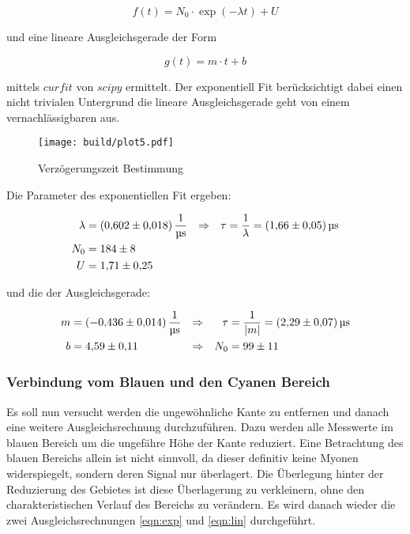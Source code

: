 \begin{equation}
	f(t)=N_0 \cdot \exp(-\lambda t) + U
	\label{eqn:exp}
\end{equation}

und eine lineare Ausgleichsgerade der Form

\begin{equation}
	g(t)=m \cdot t +b
	\label{eqn:lin}
\end{equation}

mittels $curfit$ von $scipy$ ermittelt. 
Der exponentiell Fit berücksichtigt dabei einen nicht trivialen Untergrund die lineare Ausgleichsgerade geht von einem vernachlässigbaren aus. 

\begin{figure}[H]
	\centering
	\texttt{[image: build/plot5.pdf]}
	\caption{Verzögerungszeit Bestimmung}\label{fig:plt5}
\end{figure}

Die Parameter des exponentiellen Fit ergeben:

\begin{align}
	\lambda&=\qty{0.602(0.018)}{\per\us} &\Rightarrow & & \tau&=\frac{1}{\lambda }=\qty{1.66(0.05)}{\us} \\
	N_0&=\num{184(8)} \notag \\
	U&=\num{1.71(0.25)} \notag
\end{align}

und die der Ausgleichsgerade: 

\begin{align}
	m&=\qty{-0.436(0.014)}{\per\us} &\Rightarrow & & \tau&=\frac{1}{|m|}=\qty{2.29(0.07)}{\us} \\
	b&=\num{4.59(0.11)} &\Rightarrow & & N_0&=\num{99(11)} \notag
\end{align}

\subsubsection{Verbindung vom Blauen und den Cyanen Bereich}
Es soll nun versucht werden die ungewöhnliche Kante zu entfernen und danach eine weitere Ausgleichsrechnung durchzuführen. 
Dazu werden alle Messwerte im blauen Bereich um die ungefähre Höhe der Kante reduziert. 
Eine Betrachtung des blauen Bereichs allein ist nicht sinnvoll, da dieser definitiv keine Myonen widerspiegelt, sondern deren Signal nur überlagert. 
Die Überlegung hinter der Reduzierung des Gebietes ist diese Überlagerung zu verkleinern, ohne den charakteristischen Verlauf des Bereichs zu verändern. 
Es wird danach wieder die zwei Ausgleichsrechnungen \eqref{eqn:exp} und \eqref{eqn:lin} durchgeführt. 

